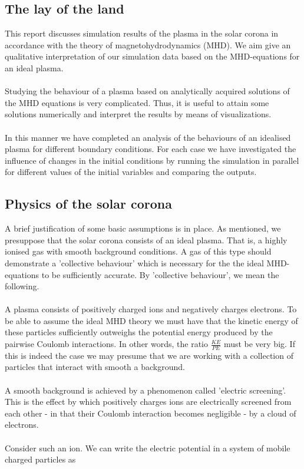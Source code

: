 

\subsection*{The lay of the land}

This report discusses simulation results of the plasma in the solar corona in accordance with the theory of magnetohydrodynamics (MHD). We aim give an qualitative interpretation of our simulation data based on the MHD-equations for an ideal plasma.\\
\\
Studying the behaviour of a plasma based on analytically acquired solutions of the MHD equations is very complicated. Thus, it is useful to attain some solutions numerically and interpret the results by means of visualizations.\\
\\
In this manner we have completed an analysis of the behaviours of an idealised plasma for different boundary conditions. For each case we have investigated the influence of changes in the initial conditions by running the simulation in parallel for different values of the initial variables and comparing the outputs. 

\subsection*{Physics of the solar corona}

A brief justification of some basic assumptions is in place. As mentioned, we presuppose that the solar corona consists of an ideal plasma. That is, a highly ionised gas with smooth background conditions. A gas of this type should demonstrate a 'collective behaviour' which is necessary for the the ideal MHD-equations to be sufficiently accurate. By 'collective behaviour', we mean the following.\\
\\
A plasma consists of positively charged ions and negatively charges electrons. To be able to assume the ideal MHD theory we must have that the kinetic energy of these particles sufficiently outweighs the potential energy produced by the pairwise Coulomb interactions. In other words, the ratio $ \frac{KE}{PE} $ must be very big. If this is indeed the case we may presume that we are working with a collection of particles that interact with smooth a background.\\
\\
A smooth background is achieved by a phenomenon called 'electric screening'. This is the effect by which positively charges ions are electrically screened from each other - in that their Coulomb interaction becomes negligible - by a cloud of electrons.\\
\\
Consider such an ion. We can write the electric potential in a system of mobile charged particles as 

